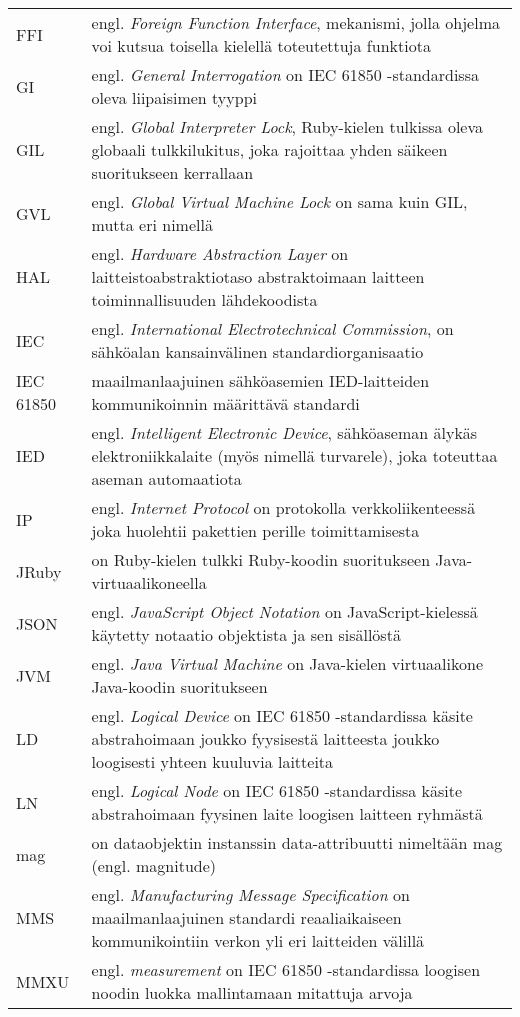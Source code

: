 \begin{tabularx}{\linewidth}[h]{@{} p{} p{} @{}}
	FFI & engl. \emph{Foreign Function Interface}, mekanismi, jolla ohjelma voi kutsua toisella kielellä toteutettuja funktiota \\
	GI & engl. \emph{General Interrogation} on IEC 61850 -standardissa oleva liipaisimen tyyppi \\
	GIL & engl. \emph{Global Interpreter Lock}, Ruby-kielen tulkissa oleva globaali tulkkilukitus, joka rajoittaa yhden säikeen suoritukseen kerrallaan \\
	GVL & engl. \emph{Global Virtual Machine Lock} on sama kuin GIL, mutta eri nimellä \\
	HAL & engl. \emph{Hardware Abstraction Layer} on laitteistoabstraktiotaso abstraktoimaan laitteen toiminnallisuuden lähdekoodista \\
	IEC & engl. \emph{International Electrotechnical Commission}, on sähköalan kansainvälinen standardiorganisaatio \\
	IEC 61850 & maailmanlaajuinen sähköasemien IED-laitteiden kommunikoinnin määrittävä standardi \\
	IED & engl. \emph{Intelligent Electronic Device}, sähköaseman älykäs elektroniikkalaite (myös nimellä turvarele), joka toteuttaa aseman automaatiota \\
	IP & engl. \emph{Internet Protocol} on protokolla verkkoliikenteessä joka huolehtii pakettien perille toimittamisesta \\
	JRuby & on Ruby-kielen tulkki Ruby-koodin suoritukseen Java-virtuaalikoneella \\
	JSON & engl. \emph{JavaScript Object Notation} on JavaScript-kielessä käytetty notaatio objektista ja sen sisällöstä \\
	JVM & engl. \emph{Java Virtual Machine} on Java-kielen virtuaalikone Java-koodin suoritukseen \\
	LD & engl. \emph{Logical Device} on IEC 61850 -standardissa käsite abstrahoimaan joukko fyysisestä laitteesta joukko loogisesti yhteen kuuluvia laitteita \\
	LN & engl. \emph{Logical Node} on IEC 61850 -standardissa käsite abstrahoimaan fyysinen laite loogisen laitteen ryhmästä \\
	mag & on dataobjektin instanssin data-attribuutti nimeltään mag (engl. magnitude) \\
	MMS & engl. \emph{Manufacturing Message Specification} on maailmanlaajuinen standardi reaaliaikaiseen kommunikointiin verkon yli eri laitteiden välillä \\
	MMXU & engl. \emph{measurement} on IEC 61850 -standardissa loogisen noodin luokka mallintamaan mitattuja arvoja \\

\end{tabularx}

